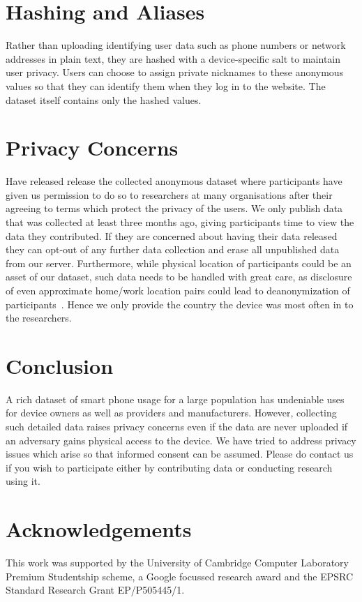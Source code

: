\documentclass{sig-alternate}
\begin{document}
\section{Hashing and Aliases}
Rather than uploading identifying user data such as phone numbers or network addresses in plain text, they are hashed with a device-specific salt to maintain user privacy.
Users can choose to assign private nicknames to these anonymous values so that they can identify them when they log in to the website.
The dataset itself contains only the hashed values.

\section{Privacy Concerns}
Have released release the collected anonymous dataset where participants have given us permission to do so to researchers at many organisations after their agreeing to terms which protect the privacy of the users.
We only publish data that was collected at least three months ago, giving participants time to view the data they contributed.
If they are concerned about having their data released they can opt-out of any further data collection and erase all unpublished data from our server.
Furthermore, while physical location of participants could be an asset of our dataset, such data needs to be handled with great care, as disclosure of even approximate home/work location pairs could lead to deanonymization of participants~\cite{Golle2009}.
Hence we only provide the country the device was most often in to the researchers.

\section{Conclusion}
A rich dataset of smart phone usage for a large population has undeniable uses for device owners as well as providers and manufacturers.
However, collecting such detailed data raises privacy concerns even if the data are never uploaded if an adversary gains physical access to the device.
We have tried to address privacy issues which arise so that informed consent can be assumed.
Please do contact us if you wish to participate either by contributing data or conducting research using it.

\section{Acknowledgements}
This work was supported by the University of Cambridge Computer Laboratory Premium Studentship scheme, a Google focussed research award and the EPSRC Standard Research Grant EP/P505445/1.

\printbibliography
\end{document}
